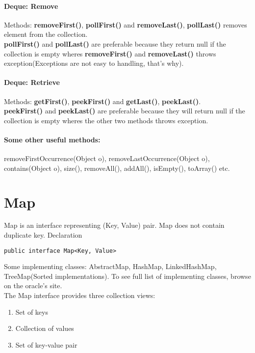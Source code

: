 \documentclass[10 pt]{article}
\begin{document}
\paragraph{Deque: Remove}
Methods: \textbf{removeFirst()}, \textbf{pollFirst()} and \textbf{removeLast()}, \textbf{pollLast()} removes element from the collection. \\
\textbf{pollFirst()} and \textbf{pollLast()} are preferable because they return null if the collection is empty wheres \textbf{removeFirst()} and \textbf{removeLast()} throws exception(Exceptions are not easy to handling, that's why).
\paragraph{Deque: Retrieve}
Methods: \textbf{getFirst()}, \textbf{peekFirst()} and \textbf{getLast()}, \textbf{peekLast()}. \\
\textbf{peekFirst()} and \textbf{peekLast()} are preferable because they will return null if the collection is empty wheres the other two methods throws exception. \\
\paragraph{Some other useful methods:} removeFirstOccurrence(Object o), removeLastOccurrence(Object o), contains(Object o), size(), removeAll(), addAll(), isEmpty(), toArray() etc.

\section{Map}
Map is an interface representing (Key, Value) pair. Map does not contain duplicate key. Declaration
\begin{lstlisting}
public interface Map<Key, Value>
\end{lstlisting}
Some implementing classes: AbstractMap, HashMap, LinkedHashMap, TreeMap(Sorted implementations). To see full list of implementing classes, browse on the oracle's site. \\
The Map interface provides three collection views:
\begin{enumerate}
	\item Set of keys
	\item Collection of values
	\item Set of key-value pair
\end{enumerate}
\end{document}
